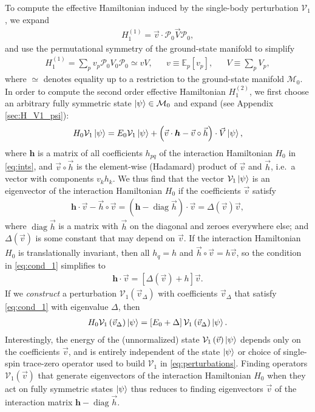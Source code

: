 \documentclass[nofootinbib,notitlepage,11pt]{revtex4-2}
\newcommand{\p}[1]{\left(#1\right)} %
\renewcommand{\sp}[1]{\left[#1\right]} %
\renewcommand{\c}{\cdot} %
\renewcommand{\oc}{\circ} %
\newcommand{\m}{\bm} %
\renewcommand{\v}{\vec} %
\newcommand{\1}{\mathds{1}}
\newcommand{\M}{\mathcal{M}}
\renewcommand{\P}{\mathcal{P}}
\newcommand{\V}{\mathcal{V}}
\newcommand{\EE}{\mathbb{E}}
\DeclareMathOperator{\diag}{diag}
\begin{document}
To compute the effective Hamiltonian induced by the single-body
perturbation $\V_1$, we expand
\begin{align}
  H_1^{(1)} = \v v \c \P_0 \v V \P_0,
\end{align}
and use the permutational symmetry of the ground-state manifold to
simplify
\begin{align}
  H_1^{(1)} =  \sum_p v_p \P_0 V_0 \P_0 \simeq v V,
  &&
  v \equiv \EE_p\sp{v_p},
  &&
  V \equiv \sum_p V_p,
  \label{eq:H_1_1}
\end{align}
where $\simeq$ denotes equality up to a restriction to the
ground-state manifold $\M_0$.  In order to compute the second order
effective Hamiltonian $H_1^{(2)}$, we first choose an arbitrary fully
symmetric state $\ket\psi\in\M_0$ and expand (see Appendix
\ref{sec:H_V1_psi}):
\begin{align}
  H_0 \V_1 \ket\psi
  = E_0 \V_1 \ket\psi
  + \p{\v v\c\m h - \v v\oc\v h}\c \v V \ket\psi,
  \label{eq:H_V1_psi_start}
\end{align}
where $\m h$ is a matrix of all coefficients $h_{pq}$ of the
interaction Hamiltonian $H_0$ in \eqref{eq:ints}, and $\v v\oc\v h$ is
the element-wise (Hadamard) product of $\v v$ and $\v h$, i.e.~a
vector with components $v_kh_k$.  We thus find that the vector
$\V_1\ket\psi$ is an eigenvector of the interaction Hamiltonian $H_0$
if the coefficients $\v v$ satisfy
\begin{align}
  \m h \c \v v - \v h\oc\v v
  = \p{\m h - \diag\v h}\c\v v
  = \Delta\p{\v v} \v v,
  \label{eq:cond_1}
\end{align}
where $\diag\v h$ is a matrix with $\v h$ on the diagonal and zeroes
everywhere else; and $\Delta\p{\v v}$ is some constant that may depend
on $\v v$.  If the interaction Hamiltonian $H_0$ is translationally
invariant, then all $h_q=h$ and $\v h\oc\v v=h\v v$, so the condition
in \eqref{eq:cond_1} simplifies to
\begin{align}
  \m h \c\v v = \sp{\Delta\p{\v v}+h} \v v.
\end{align}
If we {\it construct} a perturbation $\V_1\p{\v v_\Delta}$ with
coefficients $\v v_\Delta$ that satisfy \eqref{eq:cond_1} with
eigenvalue $\Delta$, then
\begin{align}
  H_0 \V_1\p{\v v_\Delta} \ket\psi
  = \sp{E_0 + \Delta} \V_1\p{\v v_\Delta} \ket\psi.
  \label{eq:H_V1_psi}
\end{align}
Interestingly, the energy of the (unnormalized) state
$\V_1\p{\v v}\ket\psi$ depends only on the coefficients $\v v$, and is
entirely independent of the state $\ket\psi$ or choice of single-spin
trace-zero operator used to build $\V_1$ in \eqref{eq:perturbations}.
Finding operators $\V_1\p{\v v}$ that generate eigenvectors of the
interaction Hamiltonian $H_0$ when they act on fully symmetric states
$\ket\psi$ thus reduces to finding eigenvectors $\v v$ of the
interaction matrix $\m h-\diag\v h$.
\end{document}

